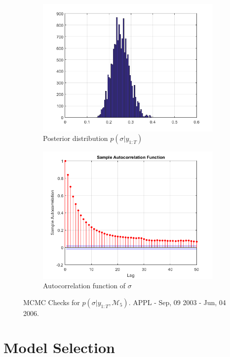 \documentclass[11pt,a4,twosided,singlespacing,titlepagenumber=on]{scrreprt}
\numberwithin{equation}{chapter} %
\theoremstyle{remark}
\begin{document}
\begin{figure}[H]
\begin{subfigure}[t]{0.38\textwidth}
        \includegraphics[width=1\textwidth]{sigma_svm/3}
        \caption{Posterior distribution $p(\sigma|y_{1:T})$}
        \label{sigma_svm_3}
    \end{subfigure}
    \begin{subfigure}[t]{0.38\textwidth}
        \centering
        \includegraphics[width=1\textwidth]{sigma_svm/4}
        \caption{Autocorrelation function of $\sigma$}
        \label{sigma_svm_4}
    \end{subfigure}
    \caption{MCMC Checks for $p(\sigma|y_{1:T}, \mathcal{M}_5)$. APPL - Sep, 09 2003 - Jun, 04 2006.}
    \label{sigma_svm_checks}
\end{figure}


\section{Model Selection}
\end{document}
